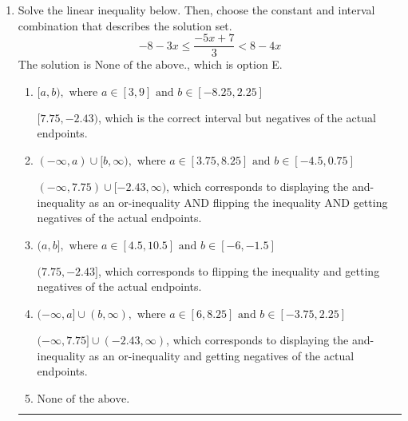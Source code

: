 \documentclass{extbook}[14pt]
\newcommand{\litem}[1]{\item #1

\rule{\textwidth}{0.4pt}}
\begin{document}
\begin{enumerate}
{\begin{enumerate}[label=\Alph*.]
Corresponds to including the endpoints (when they should be excluded).
\item \( (-\infty, a) \cup (b, \infty), \text{ where } a \in [-12.75, -7.5] \text{ and } b \in [-11.25, 0] \)

 * Correct option.
\item \( (-\infty, a] \cup [b, \infty), \text{ where } a \in [0.75, 3.75] \text{ and } b \in [6.75, 12] \)

Corresponds to including the endpoints AND negating.
\item \( (-\infty, a) \cup (b, \infty), \text{ where } a \in [2.25, 4.5] \text{ and } b \in [6.75, 14.25] \)

Corresponds to inverting the inequality and negating the solution.
\item \( (-\infty, \infty) \)

Corresponds to the variable canceling, which does not happen in this instance.
\end{enumerate}

\textbf{General Comment:} When multiplying or dividing by a negative, flip the sign.
}
\litem{
Solve the linear inequality below. Then, choose the constant and interval combination that describes the solution set.
\[ -8 - 3 x \leq \frac{-5 x + 7}{3} < 8 - 4 x \]The solution is \( \text{None of the above.} \), which is option E.\begin{enumerate}[label=\Alph*.]
\item \( [a, b), \text{ where } a \in [3, 9] \text{ and } b \in [-8.25, 2.25] \)

$[7.75, -2.43)$, which is the correct interval but negatives of the actual endpoints.
\item \( (-\infty, a) \cup [b, \infty), \text{ where } a \in [3.75, 8.25] \text{ and } b \in [-4.5, 0.75] \)

$(-\infty, 7.75) \cup [-2.43, \infty)$, which corresponds to displaying the and-inequality as an or-inequality AND flipping the inequality AND getting negatives of the actual endpoints.
\item \( (a, b], \text{ where } a \in [4.5, 10.5] \text{ and } b \in [-6, -1.5] \)

$(7.75, -2.43]$, which corresponds to flipping the inequality and getting negatives of the actual endpoints.
\item \( (-\infty, a] \cup (b, \infty), \text{ where } a \in [6, 8.25] \text{ and } b \in [-3.75, 2.25] \)

$(-\infty, 7.75] \cup (-2.43, \infty)$, which corresponds to displaying the and-inequality as an or-inequality and getting negatives of the actual endpoints.
\item \( \text{None of the above.} \)


\end{enumerate}}
\end{enumerate}
\end{document}
